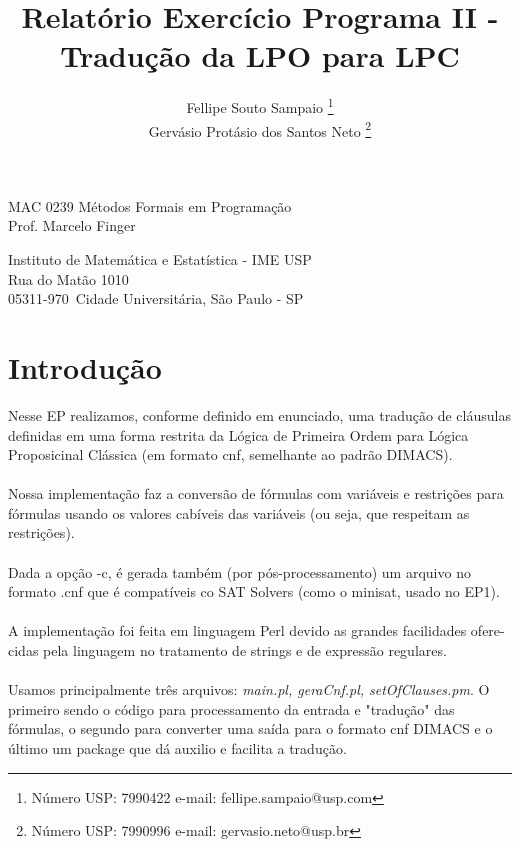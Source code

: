 \documentclass[a4paper]{article}
\title{Relatório Exercício Programa II - Tradução da LPO para LPC}
\author{
Fellipe Souto Sampaio \footnote{Número USP: 7990422 e-mail: fellipe.sampaio@usp.com}\\
Gervásio Protásio dos Santos Neto \footnote{Número USP: 7990996 e-mail: gervasio.neto@usp.br}\\
}
\begin{document}
\maketitle

\begin{center}
MAC 0239 Métodos Formais em Programação\\
Prof. Marcelo Finger \\
             
\end{center}

\begin{center}
Instituto de Matemática e Estatística - IME USP \\
 Rua do Matão 1010 \\
 05311-970\, Cidade Universitária, São Paulo - SP \\
\end{center}

\newpage

\section{Introdução}

Nesse EP realizamos, conforme definido em enunciado, uma tradução de cláusulas definidas em uma forma restrita da Lógica de Primeira Ordem para Lógica Proposicinal Clássica (em formato cnf, semelhante ao padrão DIMACS).\\\\
Nossa implementação faz a conversão de fórmulas com variáveis e restrições para fórmulas usando os valores cabíveis das variáveis (ou seja, que respeitam as restrições).\\\\
Dada a opção -c, é gerada também (por pós-processamento) um arquivo no formato .cnf que é compatíveis co SAT Solvers (como o minisat, usado no EP1).\\\\
A implementação foi feita em linguagem Perl devido as grandes facilidades ofere-cidas pela linguagem no tratamento de strings e de expressão regulares.\\\\
Usamos principalmente três arquivos: \textit{main.pl, geraCnf.pl, setOfClauses.pm}. O primeiro sendo o código para processamento da entrada e "tradução" das fórmulas, o segundo para converter uma saída para o formato cnf DIMACS e o último um package que dá auxilio e facilita a tradução.

\newpage
\end{document}
